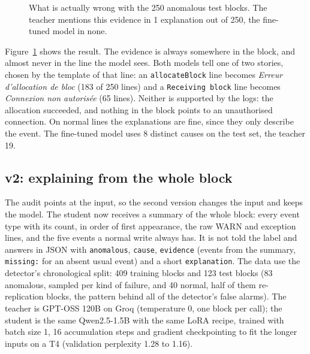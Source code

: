 \documentclass[11pt,a4paper]{article}
\newcommand{\code}[1]{\texttt{#1}}
\begin{document}
\begin{figure}[t]
\centering
{}
\caption{What is actually wrong with the 250 anomalous test blocks. The teacher mentions this
evidence in 1 explanation out of 250, the fine-tuned model in none.}
\label{fig:audit}
\end{figure}

Figure~\ref{fig:audit} shows the result. The evidence is always somewhere in the block, and
almost never in the line the model sees. Both models tell one of two stories, chosen by the
template of that line: an \code{allocateBlock} line becomes \emph{Erreur d'allocation de bloc}
(183 of 250 lines) and a \code{Receiving block} line becomes \emph{Connexion non autorisée}
(65 lines). Neither is supported by the logs: the allocation succeeded, and nothing in the
block points to an unauthorised connection. On normal lines the explanations are fine, since
they only describe the event. The fine-tuned model uses 8 distinct causes on the test set,
the teacher 19.

\subsection{v2: explaining from the whole block}

The audit points at the input, so the second version changes the input and keeps the model.
The student now receives a summary of the whole block: every event type with its count, in
order of first appearance, the raw WARN and exception lines, and the five events a normal write
always has. It is not told the label and answers in JSON with \code{anomalous}, \code{cause},
\code{evidence} (events from the summary, \code{missing:} for an absent usual event) and a short
\code{explanation}. The data use the detector's chronological split: 409 training blocks and
123 test blocks (83 anomalous, sampled per kind of failure, and 40 normal, half of them
re-replication blocks, the pattern behind all of the detector's false alarms). The teacher is
GPT-OSS 120B on Groq (temperature 0, one block per call); the student is the same
Qwen2.5-1.5B with the same LoRA recipe, trained with batch size 1, 16 accumulation steps and
gradient checkpointing to fit the longer inputs on a T4 (validation perplexity 1.28 to 1.16).
\end{document}
